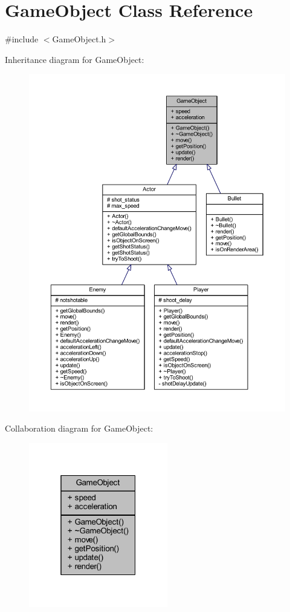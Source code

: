 \hypertarget{class_game_object}{}\section{Game\+Object Class Reference}
\label{class_game_object}


{\ttfamily \#include $<$Game\+Object.\+h$>$}



Inheritance diagram for Game\+Object\+:
\nopagebreak
\begin{figure}[H]
\begin{center}
\leavevmode
\includegraphics[width=350pt]{class_game_object__inherit__graph}
\end{center}
\end{figure}


Collaboration diagram for Game\+Object\+:\nopagebreak
\begin{figure}[H]
\begin{center}
\leavevmode
\includegraphics[width=172pt]{class_game_object__coll__graph}
\end{center}
\end{figure}
